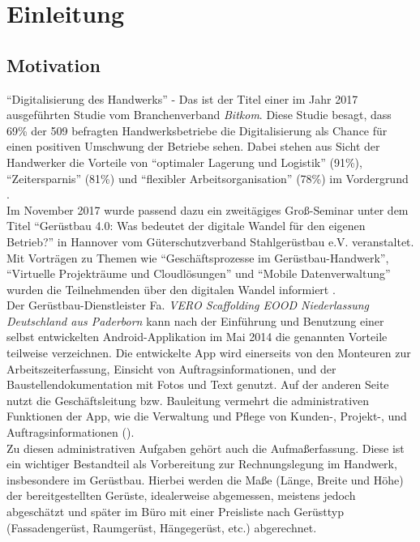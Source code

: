\chapter{Einleitung}
\section{Motivation}\label{subsec:motivation}
``Digitalisierung des Handwerks'' - Das ist der Titel einer im Jahr 2017 ausgeführten Studie vom Branchenverband \textit{Bitkom}. 
Diese Studie besagt, dass 69\% der 509 befragten Handwerksbetriebe die Digitalisierung als Chance für einen positiven Umschwung der Betriebe sehen. 
Dabei stehen aus Sicht der Handwerker die Vorteile von ``optimaler Lagerung und Logistik'' (91\%), ``Zeitersparnis'' (81\%) und ``flexibler Arbeitsorganisation'' (78\%) im Vordergrund \citep{Bitkom17}. \\

Im November 2017 wurde passend dazu ein zweitägiges Groß-Seminar unter dem Titel ``Gerüstbau 4.0: Was bedeutet der digitale Wandel für den eigenen Betrieb?'' in Hannover vom Güterschutzverband Stahlgerüstbau e.V. veranstaltet. 
Mit Vorträgen zu Themen wie ``Geschäftsprozesse im Gerüstbau-Handwerk'', ``Virtuelle Projekträume und Cloudlösungen'' und ``Mobile Datenverwaltung'' wurden die Teilnehmenden über den digitalen Wandel informiert \citep{GSV17}. \\

Der Gerüstbau-Dienstleister Fa. \emph{VERO Scaffolding EOOD Niederlassung Deutschland aus Paderborn} kann nach der Einführung und Benutzung einer selbst entwickelten Android-Applikation im Mai 2014 die genannten Vorteile teilweise verzeichnen.
Die entwickelte App wird einerseits von den Monteuren zur Arbeitszeiterfassung, Einsicht von Auftragsinformationen, und der Baustellendokumentation mit Fotos und Text genutzt. Auf der anderen Seite nutzt die Geschäftsleitung bzw. Bauleitung vermehrt die administrativen Funktionen der App, wie die Verwaltung und Pflege von Kunden-, Projekt-, und Auftragsinformationen (). \\

Zu diesen administrativen Aufgaben gehört auch die Aufmaßerfassung.
Diese ist ein wichtiger Bestandteil als Vorbereitung zur Rechnungslegung im Handwerk, insbesondere im Gerüstbau. 
Hierbei werden die Maße (Länge, Breite und Höhe) der bereitgestellten Gerüste, idealerweise abgemessen, meistens jedoch abgeschätzt und später im Büro mit einer Preisliste nach Gerüsttyp (Fassadengerüst, Raumgerüst, Hängegerüst, etc.) abgerechnet. \\

